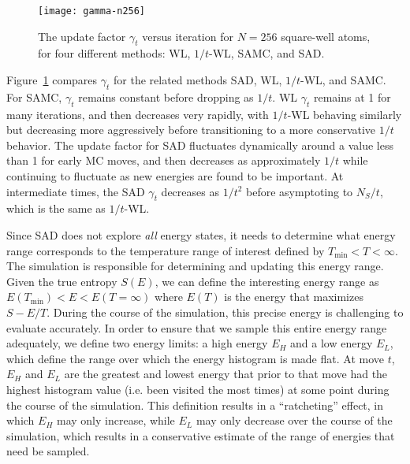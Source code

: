 \documentclass[letterpaper,twocolumn,amsmath,amssymb,pre,aps,10pt]{revtex4-1}
\begin{document}
\begin{figure}
  \texttt{[image: gamma-n256]}
  \caption{The update factor $\gamma_t$ versus iteration for $N=256$
    square-well atoms, for four different methods: WL, $1/t$-WL, SAMC,
    and SAD.}
    \label{fig:gamma-vs-t}
\end{figure}
Figure~\ref{fig:gamma-vs-t} compares $\gamma_t$ for the related
methods SAD, WL, $1/t$-WL, and SAMC.  For SAMC, $\gamma_t$ remains
constant before dropping as $1/t$.  WL $\gamma_t$ remains at 1 for
many iterations, and then decreases very rapidly, with $1/t$-WL
behaving similarly but decreasing more aggressively before
transitioning to a more conservative $1/t$ behavior.  The update
factor for SAD fluctuates dynamically around a value less than 1 for
early MC moves, and then decreases as approximately $1/t$ while
continuing to fluctuate as new energies are found to be important.  At
intermediate times, the SAD $\gamma_t$ decreases as $1/t^2$ before
asymptoting to $N_S/t$, which is the same as $1/t$-WL.

Since SAD does not explore \emph{all} energy states, it needs to
determine what energy range corresponds to the temperature range of
interest defined by $T_{\min}<T<\infty$. The simulation is responsible
for determining and updating this energy range. Given the true entropy
$S(E)$, we can define the interesting energy range as
  $E(T_{\min}) <E< E(T=\infty)$
where $E(T)$ is the energy that maximizes $S-E/T$.  During the course of the
simulation, this precise energy is challenging to evaluate accurately.
In order to ensure that we sample this entire energy range adequately,
we define two energy limits:  a high energy $E_H$ and a low
energy $E_L$, which define the range over which the energy histogram
is made flat. At move $t$, $E_H$ and $E_L$ are the greatest and lowest
energy that prior to that move
had the highest histogram value (i.e. been visited the most times) at some point
during the course of the simulation.
This definition results in a ``ratcheting'' effect, in which $E_H$
may only increase, while $E_L$ may only decrease over the course of the
simulation, which results in a conservative estimate of the range of
energies that need be sampled.
\end{document}
